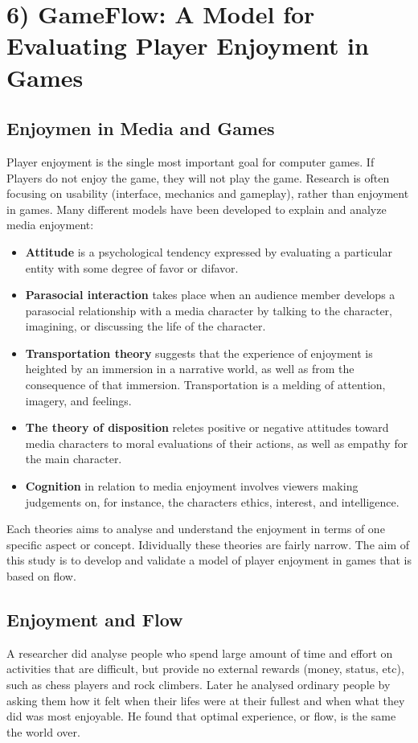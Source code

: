 \chapter*{6) GameFlow: A Model for Evaluating Player Enjoyment in Games}

  \section*{Enjoymen in Media and Games}
  Player enjoyment is the single most important goal for computer games. If Players do not enjoy the game, they will not play the game. Research is often focusing on usability (interface, mechanics and gameplay), rather than enjoyment in games. Many different models have been developed to explain and analyze media enjoyment:

    \begin{itemize}
      \item {\bf Attitude} is a psychological tendency expressed by evaluating a particular entity with some degree of favor or difavor.
      \item {\bf Parasocial interaction} takes place when an audience member develops a parasocial relationship with a media character by talking to the character, imagining, or discussing the life of the character. 
      \item {\bf Transportation theory} suggests that the experience of enjoyment is heighted by an immersion in a narrative world, as well as from the consequence of that immersion. Transportation is a melding of attention, imagery, and feelings.
      \item {\bf The theory of disposition} reletes positive or negative attitudes toward media characters to moral evaluations of their actions, as well as empathy for the main character. 
      \item {\bf Cognition} in relation to media enjoyment involves viewers making judgements on, for instance, the characters ethics, interest, and intelligence. 
    \end{itemize}

  Each theories aims to analyse and understand the enjoyment in terms of one specific aspect or concept. Idividually these theories are fairly narrow. 
  The aim of this study is to develop and validate a model of player enjoyment in games that is based on flow. 

  \section*{Enjoyment and Flow}
  A researcher did analyse people who spend large amount of time and effort on activities that are difficult, but provide no external rewards (money, status, etc), such as chess players and rock climbers. Later he analysed ordinary people by asking them how it felt when their lifes were at their fullest and when what they did was most enjoyable. He found that optimal experience, or flow, is the same the world over. 

